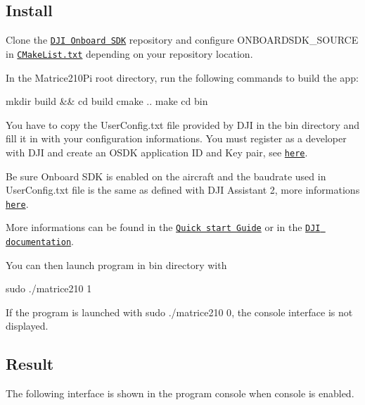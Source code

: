 \subsection*{Install}

Clone the \href{https://github.com/dji-sdk/Onboard-SDK/}{\tt D\+JI Onboard S\+DK} repository and configure {\ttfamily O\+N\+B\+O\+A\+R\+D\+S\+D\+K\+\_\+\+S\+O\+U\+R\+CE} in \href{CMakeLists.txt}{\tt C\+Make\+List.\+txt} depending on your repository location.

In the {\ttfamily Matrice210\+Pi} root directory, run the following commands to build the app\+: 
\begin{DoxyCode}
mkdir build && cd build
cmake ..
make
cd bin
\end{DoxyCode}


You have to copy the {\ttfamily User\+Config.\+txt} file provided by D\+JI in the {\ttfamily bin} directory and fill it in with your configuration informations. You must register as a developer with D\+JI and create an O\+S\+DK application ID and Key pair, see \href{https://developer.dji.com/onboard-sdk/documentation/development-workflow/environment-setup.html#onboard-sdk-application-registration}{\tt here}.

Be sure Onboard S\+DK is enabled on the aircraft and the baudrate used in {\ttfamily User\+Config.\+txt} file is the same as defined with D\+JI Assistant 2, more informations \href{https://developer.dji.com/onboard-sdk/documentation/development-workflow/environment-setup.html}{\tt here}.

More informations can be found in the \href{https://developer.dji.com/onboard-sdk/documentation/quick-start/quick-start.html}{\tt Quick start Guide} or in the \href{https://developer.dji.com/onboard-sdk/documentation/introduction/homepage.html}{\tt D\+JI documentation}.

You can then launch program in {\ttfamily bin} directory with 
\begin{DoxyCode}
sudo ./matrice210 1
\end{DoxyCode}


If the program is launched with {\ttfamily sudo ./matrice210 0}, the console interface is not displayed.

\subsection*{Result}

The following interface is shown in the program console when console is enabled.



